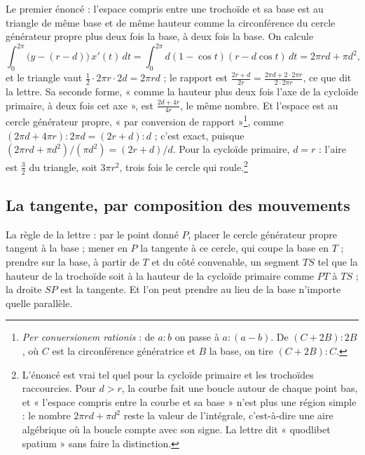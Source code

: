 \documentclass[11pt,a4paper]{article}
\begin{document}
Le premier énoncé : l'espace compris entre une trochoïde et sa base est au
triangle de même base et de même hauteur comme la circonférence du cercle
générateur propre plus deux fois la base, à deux fois la base. On calcule
\[
\int_0^{2\pi}\bigl(y-(r-d)\bigr)\,x'(t)\,dt=\int_0^{2\pi} d(1-\cos t)(r-d\cos t)\,dt
= 2\pi r d+\pi d^2 ,
\]
et le triangle vaut $\tfrac12\cdot 2\pi r\cdot 2d = 2\pi r d$ ; le rapport est
$\frac{2r+d}{2r} = \frac{2\pi d+2\cdot 2\pi r}{2\cdot 2\pi r}$, ce que dit la
lettre. Sa seconde forme, « comme la hauteur plus deux fois l'axe de la cycloïde
primaire, à deux fois cet axe », est $\frac{2d+4r}{4r}$, le même nombre. Et
l'espace est au cercle générateur propre, « par conversion de
rapport »\footnote{\emph{Per conuersionem rationis} : de $a:b$ on passe à
$a:(a-b)$. De $(C+2B):2B$, où $C$ est la circonférence génératrice et $B$ la
base, on tire $(C+2B):C$.}, comme $(2\pi d+4\pi r) : 2\pi d = (2r+d) : d$ ;
c'est exact, puisque $(2\pi r d+\pi d^2)/(\pi d^2) = (2r+d)/d$. Pour la cycloïde
primaire, $d=r$ : l'aire est $\tfrac32$ du triangle, soit $3\pi r^2$, trois fois
le cercle qui roule.\footnote{L'énoncé est vrai tel quel pour la cycloïde
primaire et les trochoïdes raccourcies. Pour $d>r$, la courbe fait une boucle
autour de chaque point bas, et « l'espace compris entre la courbe et sa base »
n'est plus une région simple : le nombre $2\pi rd+\pi d^2$ reste la valeur de
l'intégrale, c'est-à-dire une aire algébrique où la boucle compte avec son
signe. La lettre dit « quodlibet spatium » sans faire la distinction.}

\subsection*{La tangente, par composition des mouvements}

La règle de la lettre : par le point donné $P$, placer le cercle générateur
propre tangent à la base ; mener en $P$ la tangente à ce cercle, qui coupe la
base en $T$ ; prendre sur la base, à partir de $T$ et du côté convenable, un
segment $TS$ tel que la hauteur de la trochoïde soit à la hauteur de la cycloïde
primaire comme $PT$ à $TS$ ; la droite $SP$ est la tangente. Et l'on peut prendre
au lieu de la base n'importe quelle parallèle.
\end{document}
